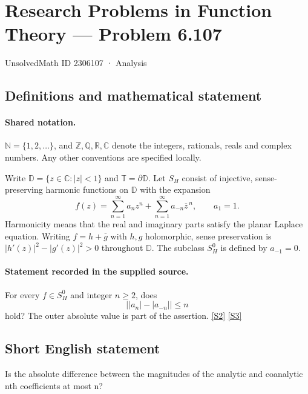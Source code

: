 \documentclass[11pt]{article}
\newcommand{\sref}[2]{\hyperlink{source:#1:#2}{[S#2]}}
\begin{document}
\setcounter{section}{2306106}
\section{Research Problems in Function Theory — Problem 6.107}\label{2306107}
{\small\sffamily UnsolvedMath ID 2306107 · Analysis}
\subsection{Definitions and mathematical statement}

\paragraph{Shared notation.}$\mathbb N=\{1,2,\ldots\}$, and $\mathbb Z,\mathbb Q,\mathbb R,\mathbb C$ denote the integers, rationals, reals and complex numbers. Any other conventions are specified locally.


Write $\mathbb D=\{z\in\mathbb C:|z|<1\}$ and $\mathbb T=\partial\mathbb D$. Let $S_H$ consist of injective, sense-preserving harmonic functions on $\mathbb D$ with the expansion
\[f(z)=\sum_{n=1}^{\infty}a_nz^n+\sum_{n=1}^{\infty}a_{-n}\overline z^{\,n},\qquad a_1=1.\]
Harmonicity means that the real and imaginary parts satisfy the planar Laplace equation. Writing $f=h+\overline g$ with $h,g$ holomorphic, sense preservation is $|h'(z)|^2-|g'(z)|^2>0$ throughout $\mathbb D$. The subclass $S_H^0$ is defined by $a_{-1}=0$.

\paragraph{Statement recorded in the supplied source.}
For every $f\in S_H^0$ and integer $n\geq2$, does
\[\bigl||a_n|-|a_{-n}|\bigr|\leq n\]
hold? The outer absolute value is part of the assertion. \sref{2306107}{2} \sref{2306107}{3}
\subsection{Short English statement}
Is the absolute difference between the magnitudes of the analytic and coanalytic nth coefficients at most n?
\end{document}
